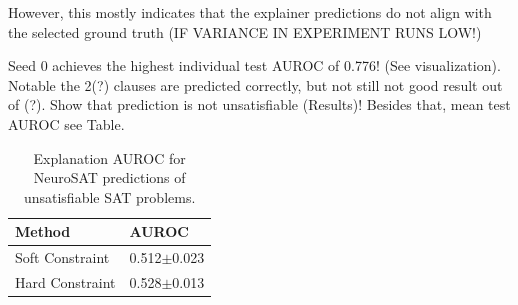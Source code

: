 However, this mostly indicates that the explainer predictions do not align with the selected ground truth (IF VARIANCE IN EXPERIMENT RUNS LOW!)

Seed 0 achieves the highest individual test AUROC of 0.776! (See visualization). Notable the 2(?) clauses are predicted correctly, but not still not good result out of (?). Show that prediction is not unsatisfiable (Results)! Besides that, mean test AUROC see Table.


\begin{table}[ht]
    \centering
    \scriptsize
    \begin{tabularx}{0.35\textwidth}{l*{1}{X}}   %
    \toprule
    \textbf{Method} & \textbf{AUROC} \\
    \midrule
    Soft Constraint & 0.512$\pm$0.023 \\
    \midrule
    Hard Constraint & 0.528$\pm$0.013 \\
    \bottomrule
    \end{tabularx}
    \caption[Inductive performance of explainer on NeuroSAT]{Explanation AUROC for NeuroSAT predictions of unsatisfiable SAT problems.}
    \label{tab:res_neuroSAT}
\end{table}